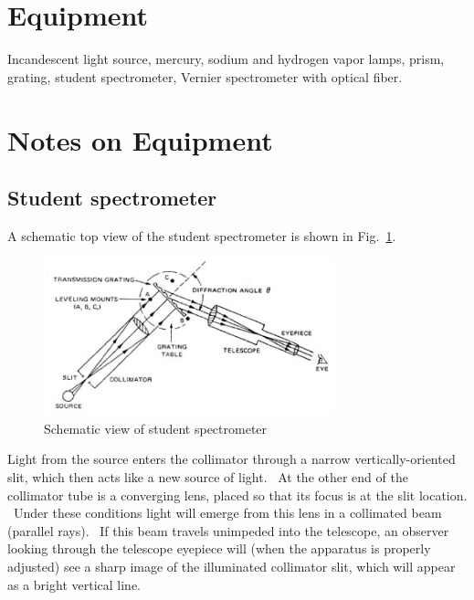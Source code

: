 \section{Equipment}
Incandescent light source, mercury, sodium and hydrogen
vapor lamps, prism, grating, student spectrometer, Vernier spectrometer with optical fiber.

\section{Notes on Equipment}

\subsection{Student spectrometer}

A schematic top view of the student spectrometer is shown in Fig.~\ref{fig:studentspec}.

\begin{figure}
\begin{centering}
\includegraphics[width=0.75\textwidth]{../images/spectrometer-top.jpg} 
\caption{Schematic view of student spectrometer}
\label{fig:studentspec}
\end{centering}
\end{figure}

Light from the source enters the collimator through a narrow
vertically-oriented slit, which then acts like a new source of light.
\ At the other end of the collimator tube is a converging lens, placed
so that its focus is at the slit location. \ Under these conditions
light will emerge from this lens in a collimated beam (parallel rays).
\ If this beam travels unimpeded into the telescope, an observer
looking through the telescope eyepiece will (when the apparatus is
properly adjusted) see a sharp image of the illuminated collimator
slit, which will appear as a bright vertical line.

